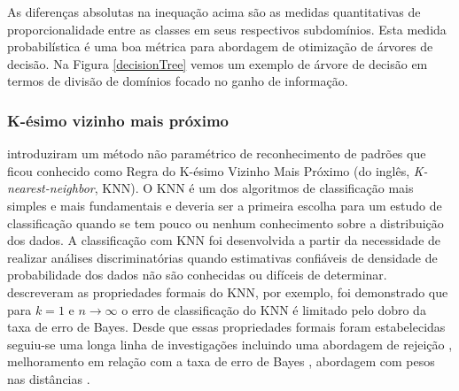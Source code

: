 As diferenças absolutas na inequação acima são as medidas quantitativas de
proporcionalidade entre as classes em seus respectivos subdomínios. Esta medida
probabilística é uma boa métrica para abordagem de otimização de árvores de
decisão. Na Figura \ref{decisionTree} vemos um exemplo de árvore de decisão em
termos de divisão de domínios focado no ganho de informação.

\subsubsection{K-ésimo vizinho mais próximo}

 introduziram um método não
paramétrico de reconhecimento de padrões que ficou conhecido como Regra do
K-ésimo Vizinho Mais Próximo (do inglês, \textit{K-nearest-neighbor}, KNN). O
KNN é um dos algoritmos de classificação mais simples e mais fundamentais e
deveria ser a primeira escolha para um estudo de classificação quando se tem
pouco ou nenhum conhecimento sobre a distribuição dos dados. A classificação com
KNN foi desenvolvida a partir da necessidade de realizar análises
discriminatórias quando estimativas confiáveis de densidade de probabilidade dos
dados não são conhecidas ou difíceis de determinar.
 descreveram as propriedades
formais do KNN, por exemplo, foi demonstrado que para \(k = 1\) e \(n \to
\infty\) o erro de classificação do KNN é limitado pelo dobro da taxa de erro de
Bayes. Desde que essas propriedades formais foram estabelecidas seguiu-se uma
longa linha de investigações incluindo uma abordagem de rejeição
, melhoramento em relação com a taxa
de erro de Bayes , abordagem com pesos nas
distâncias \cite{peterson2009knn}.

